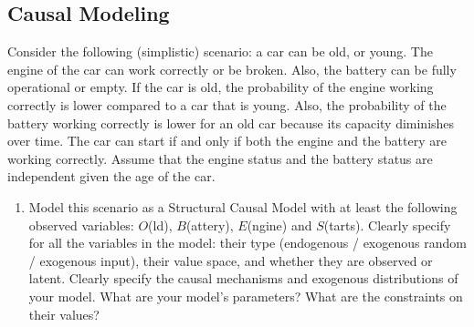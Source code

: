 \subsection{Causal Modeling}
Consider the following (simplistic) scenario: a car can be old, or young. The engine of the car can work correctly or be broken. Also, the battery can be fully operational or empty. If the car is old, the probability of the engine working correctly is lower compared to a car that is young. Also, the probability of the battery working correctly is lower for an old car because its capacity diminishes over time. The car can start if and only if both the engine and the battery are working correctly. Assume that the engine status and the battery status are independent given the age of the car.
\begin{enumerate}[label=\alph*)]
  \item Model this scenario as a Structural Causal Model with at least the following observed variables:
    $O$(ld), $B$(attery), $E$(ngine) and $S$(tarts).
    Clearly specify for all the variables in the model: their type (endogenous / exogenous random / exogenous input), their value space, and whether they are observed or latent.
    Clearly specify the causal mechanisms and exogenous distributions of your model.
    What are your model's parameters? What are the constraints on their values?
\end{enumerate}
